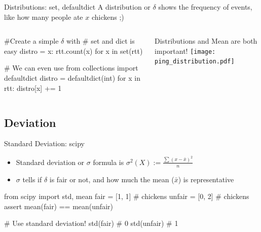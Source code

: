 \begin{pyframe}{Distributions: set, defaultdict}
A distribution or $\delta$ shows the frequency of events, like 
how many people ate $x$ chickens ;)
\begin{columns}
\begin{pythoncode}
#Create a simple $\delta$ with
#    set and dict is easy
distro = {x: rtt.count(x) 
  for x in set(rtt)}
  
# We can even use
from collections import defaultdict
distro = defaultdict(int)
for x in rtt:
    distro[x] += 1
    

\end{pythoncode}
\footnotesize
Distributions and Mean are both important!
\texttt{[image: ping\_distribution.pdf]}  
\end{columns}
\end{pyframe}

\subsection{Deviation}
\begin{pyframe}{Standard Deviation: scipy}
\begin{itemize}
\item Standard deviation or $\sigma$ formula is  $\sigma^{2}(X) := \frac{ \sum(x-\bar{x})^{2} }{n} $
\item $\sigma$ tells if $\delta$ is fair or not, and how much the mean ($\bar{x}$) is representative
\end{itemize}
\begin{pythoncode}
from scipy import std, mean
fair = [1, 1] # chickens
unfair = [0, 2] # chickens
assert mean(fair) == mean(unfair)

# Use standard deviation!
std(fair) # 0
std(unfair) # 1
\end{pythoncode}
\end{pyframe}


